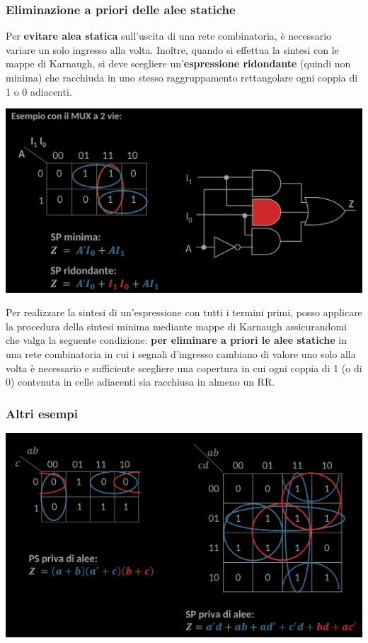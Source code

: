 \documentclass{article}
\begin{document}
\subsubsection{Eliminazione a priori delle alee statiche}
Per \textbf{evitare alea statica} sull’uscita di una rete combinatoria, è necessario variare un solo ingresso alla volta. Inoltre, quando si effettua la sintesi con le mappe di Karnaugh, si deve scegliere un’\textbf{espressione ridondante} (quindi non minima) che racchiuda in uno stesso raggruppamento rettangolare ogni coppia di 1 o 0 adiacenti.
\begin{center}
    \includegraphics[scale=0.5]{esMuxAlea.png}
\end{center}
Per realizzare la sintesi di un’espressione con tutti i termini primi, posso applicare la procedura della sintesi minima mediante mappe di Karnaugh assicurandomi che valga la seguente condizione:
\textbf{\color{cyan} per eliminare a priori le alee statiche} in una rete combinatoria in cui i segnali d’ingresso cambiano di valore uno solo alla volta è necessario e sufficiente scegliere una copertura in cui ogni coppia di 1 (o di 0) contenuta in celle adiacenti sia racchiusa in almeno un RR.
\subsubsection*{Altri esempi}
\begin{center}
    \includegraphics[scale=0.45]{esAleeStatic.png}
\end{center}
\end{document}
